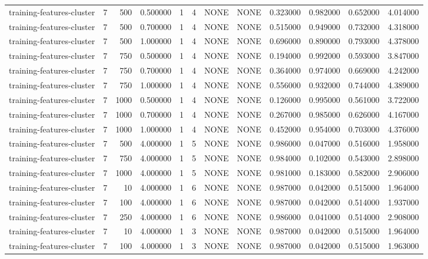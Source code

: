 \begin{tabular}{lrrrllllrrrr}
training-features-cluster & 7 & 500 & 0.500000 & 1 & 4 & NONE & NONE & 0.323000 & 0.982000 & 0.652000 & 4.014000 \\
training-features-cluster & 7 & 500 & 0.700000 & 1 & 4 & NONE & NONE & 0.515000 & 0.949000 & 0.732000 & 4.318000 \\
training-features-cluster & 7 & 500 & 1.000000 & 1 & 4 & NONE & NONE & 0.696000 & 0.890000 & 0.793000 & 4.378000 \\
training-features-cluster & 7 & 750 & 0.500000 & 1 & 4 & NONE & NONE & 0.194000 & 0.992000 & 0.593000 & 3.847000 \\
training-features-cluster & 7 & 750 & 0.700000 & 1 & 4 & NONE & NONE & 0.364000 & 0.974000 & 0.669000 & 4.242000 \\
training-features-cluster & 7 & 750 & 1.000000 & 1 & 4 & NONE & NONE & 0.556000 & 0.932000 & 0.744000 & 4.389000 \\
training-features-cluster & 7 & 1000 & 0.500000 & 1 & 4 & NONE & NONE & 0.126000 & 0.995000 & 0.561000 & 3.722000 \\
training-features-cluster & 7 & 1000 & 0.700000 & 1 & 4 & NONE & NONE & 0.267000 & 0.985000 & 0.626000 & 4.167000 \\
training-features-cluster & 7 & 1000 & 1.000000 & 1 & 4 & NONE & NONE & 0.452000 & 0.954000 & 0.703000 & 4.376000 \\
training-features-cluster & 7 & 500 & 4.000000 & 1 & 5 & NONE & NONE & 0.986000 & 0.047000 & 0.516000 & 1.958000 \\
training-features-cluster & 7 & 750 & 4.000000 & 1 & 5 & NONE & NONE & 0.984000 & 0.102000 & 0.543000 & 2.898000 \\
training-features-cluster & 7 & 1000 & 4.000000 & 1 & 5 & NONE & NONE & 0.981000 & 0.183000 & 0.582000 & 2.906000 \\
training-features-cluster & 7 & 10 & 4.000000 & 1 & 6 & NONE & NONE & 0.987000 & 0.042000 & 0.515000 & 1.964000 \\
training-features-cluster & 7 & 100 & 4.000000 & 1 & 6 & NONE & NONE & 0.987000 & 0.042000 & 0.514000 & 1.937000 \\
training-features-cluster & 7 & 250 & 4.000000 & 1 & 6 & NONE & NONE & 0.986000 & 0.041000 & 0.514000 & 2.908000 \\
training-features-cluster & 7 & 10 & 4.000000 & 1 & 3 & NONE & NONE & 0.987000 & 0.042000 & 0.515000 & 1.964000 \\
training-features-cluster & 7 & 100 & 4.000000 & 1 & 3 & NONE & NONE & 0.987000 & 0.042000 & 0.515000 & 1.963000 \\

\end{tabular}
